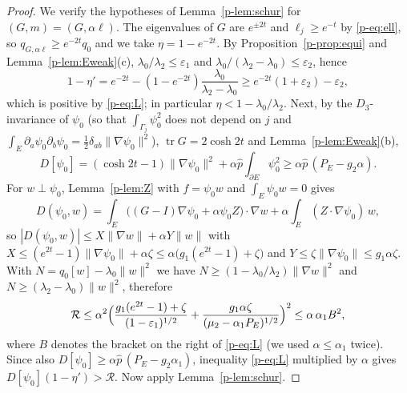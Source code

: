 \documentclass[11pt]{article}
\theoremstyle{remark}
\DeclareMathOperator{\tr}{tr}
\begin{document}
\begin{proof}
We verify the hypotheses of Lemma~\ref{p-lem:schur} for $(G,m)=(G,\alpha\ell)$. The eigenvalues of
$G$ are $e^{\pm2t}$ and $\ell_j\ge e^{-t}$ by \eqref{p-eq:ell}, so
$q_{G,\alpha\ell}\ge e^{-2t}q_0$ and we take $\eta=1-e^{-2t}$. By Proposition~\ref{p-prop:equi} and
Lemma~\ref{p-lem:Eweak}(c), $\lambda_0/\lambda_2\le\varepsilon_1$ and
$\lambda_0/(\lambda_2-\lambda_0)\le\varepsilon_2$, hence
\[
  1-\eta'=e^{-2t}-(1-e^{-2t})\frac{\lambda_0}{\lambda_2-\lambda_0}
  \ge e^{-2t}(1+\varepsilon_2)-\varepsilon_2 ,
\]
which is positive by \eqref{p-eq:L}; in particular $\eta<1-\lambda_0/\lambda_2$. Next, by the
$D_3$-invariance of $\psi_0$ (so that $\int_{\Gamma_j}\psi_0^2$ does not depend on $j$ and
$\int_E\partial_a\psi_0\partial_b\psi_0=\frac12\delta_{ab}\|\nabla\psi_0\|^2$), $\tr G=2\cosh2t$
and Lemma~\ref{p-lem:Eweak}(b),
\[
  D[\psi_0]=(\cosh2t-1)\|\nabla\psi_0\|^2+\alpha\hat p\int_{\partial E}\psi_0^2
  \ge\alpha\hat p\,(P_E-g_2\alpha).
\]
For $w\perp\psi_0$, Lemma~\ref{p-lem:Z} with $f=\psi_0w$ and $\int_E\psi_0w=0$ gives
\[
  D(\psi_0,w)=\int_E\bigl((G-I)\nabla\psi_0+\alpha\psi_0Z\bigr)\cdot\nabla w
  +\alpha\int_E(Z\cdot\nabla\psi_0)\,w ,
\]
so $|D(\psi_0,w)|\le X\|\nabla w\|+\alpha Y\|w\|$ with
$X\le(e^{2t}-1)\|\nabla\psi_0\|+\alpha\zeta\le\alpha\bigl(g_1(e^{2t}-1)+\zeta\bigr)$ and
$Y\le\zeta\|\nabla\psi_0\|\le g_1\alpha\zeta$. With $N=q_0[w]-\lambda_0\|w\|^2$ we have
$N\ge(1-\lambda_0/\lambda_2)\|\nabla w\|^2$ and $N\ge(\lambda_2-\lambda_0)\|w\|^2$, therefore
\[
  \mathcal R\le\alpha^2\Bigl(\frac{g_1(e^{2t}-1)+\zeta}{(1-\varepsilon_1)^{1/2}}
  +\frac{g_1\alpha\zeta}{(\mu_2-\alpha_1P_E)^{1/2}}\Bigr)^2\le\alpha\,\alpha_1B^2 ,
\]
where $B$ denotes the bracket on the right of \eqref{p-eq:L} (we used $\alpha\le\alpha_1$ twice).
Since also $D[\psi_0]\ge\alpha\hat p\,(P_E-g_2\alpha_1)$, inequality \eqref{p-eq:L} multiplied by
$\alpha$ gives $D[\psi_0](1-\eta')>\mathcal R$. Now apply Lemma~\ref{p-lem:schur}.
\end{proof}
\end{document}
